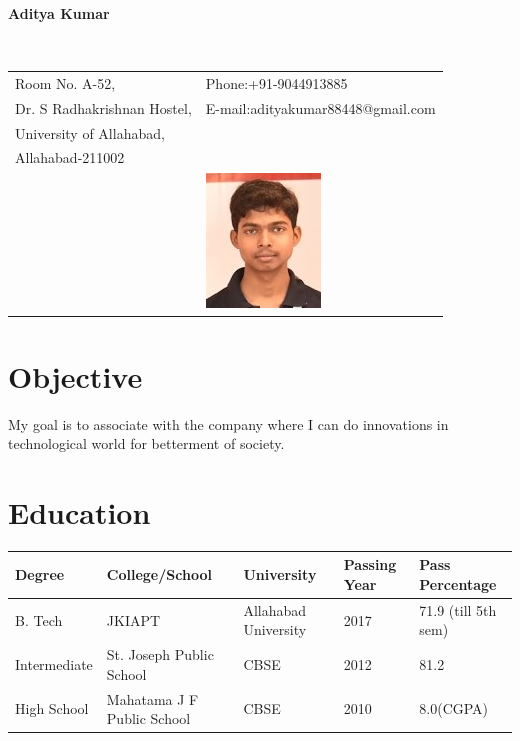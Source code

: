 \documentclass[11pt]{article}
\begin{document}
\vspace{0.5in}
	\begin{center}\begin{large}\textbf{Aditya Kumar}\end{large}\end{center}\textbf{\hrulefill}\\
	
	\begin{tabular}{@{}p{4in}p{3in}}
		Room No. A-52, & {Phone:}+91-9044913885 \\
		Dr. S Radhakrishnan Hostel, & {E-mail:}adityakumar88448@gmail.com\\
		University of Allahabad, \\
		Allahabad-211002\\
		& \includegraphics[scale=0.7]{Aditya.jpg}\\
	\end{tabular}
	
	\section*{Objective}
	My goal is to associate with the company where  I can do innovations in technological world for betterment of society.  
	\section*{Education}
	\begin{tabular}{|l|l|l|l|l|}
		\hline
		Degree & College/School & University & Passing Year & Pass Percentage\\
		\hline
		B. Tech & JKIAPT & Allahabad University & 2017 & 71.9 (till 5th sem)\\
		\hline
		Intermediate & St. Joseph Public School & CBSE & 2012 & 81.2\\
		\hline
		High School & Mahatama J F Public School & CBSE & 2010 & 8.0(CGPA)\\
		\hline
	\end{tabular}
	
\end{document}
